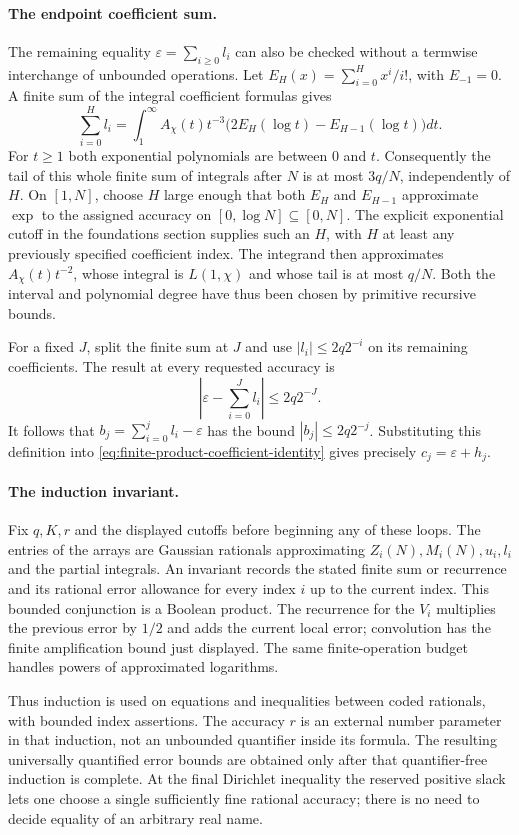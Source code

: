 \paragraph{The endpoint coefficient sum.}
The remaining equality $\varepsilon=\sum_{i\geq0}l_i$ can also be checked
without a termwise interchange of unbounded operations.  Let
$E_H(x)=\sum_{i=0}^H x^i/i!$, with $E_{-1}=0$.  A finite sum of the integral
coefficient formulas gives
\[
 \sum_{i=0}^H l_i
 =\int_1^\infty A_\chi(t)t^{-3}
              \bigl(2E_H(\log t)-E_{H-1}(\log t)\bigr)dt.
\]
For $t\geq1$ both exponential polynomials are between $0$ and $t$.
Consequently the tail of this whole finite sum of integrals after $N$ is
at most $3q/N$, independently of $H$.  On $[1,N]$, choose $H$ large enough
that both $E_H$ and $E_{H-1}$ approximate $\exp$ to the assigned accuracy
on $[0,\log N]\subseteq[0,N]$.  The explicit exponential cutoff in the
foundations section supplies such an $H$, with $H$ at least any previously
specified coefficient index.  The integrand then approximates
$A_\chi(t)t^{-2}$, whose integral is $L(1,\chi)$ and whose tail is at most
$q/N$.  Both the interval and polynomial degree have thus been chosen by
primitive recursive bounds.

For a fixed $J$, split the finite sum at $J$ and use
$|l_i|\leq2q2^{-i}$ on its remaining coefficients.  The result at every
requested accuracy is
\[
 \left|\varepsilon-\sum_{i=0}^J l_i\right|
       \leq2q2^{-J}.
\]
It follows that $b_j=\sum_{i=0}^jl_i-\varepsilon$ has the bound
$|b_j|\leq2q2^{-j}$.  Substituting this definition into
\eqref{eq:finite-product-coefficient-identity} gives precisely
$c_j=\varepsilon+h_j$.

\paragraph{The induction invariant.}
Fix $q,K,r$ and the displayed cutoffs before beginning any of these loops.
The entries of the arrays are Gaussian rationals approximating
$Z_i(N),M_i(N),u_i,l_i$ and the partial integrals.  An invariant records
the stated finite sum or recurrence and its rational error allowance for
every index $i$ up to the current index.  This bounded conjunction is a
Boolean product.  The recurrence for the $V_i$ multiplies the previous
error by $1/2$ and adds the current local error; convolution has the finite
amplification bound just displayed.  The same finite-operation budget
handles powers of approximated logarithms.

Thus induction is used on equations and inequalities between coded
rationals, with bounded index assertions.  The accuracy $r$ is an external
number parameter in that induction, not an unbounded quantifier inside
its formula.  The resulting universally quantified error bounds are
obtained only after that quantifier-free induction is complete.  At the
final Dirichlet inequality the reserved positive slack lets one choose a
single sufficiently fine rational accuracy; there is no need to decide
equality of an arbitrary real name.

